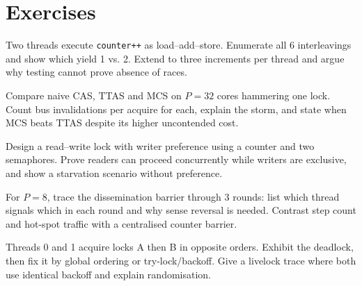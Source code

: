 \section{Exercises}
\begin{exercise}Two threads execute \texttt{counter++} as load--add--store. Enumerate all 6 interleavings and show which yield 1 vs. 2. Extend to three increments per thread and argue why testing cannot prove absence of races.\end{exercise}
\begin{exercise}Compare naive CAS, TTAS and MCS on $P=32$ cores hammering one lock. Count bus invalidations per acquire for each, explain the storm, and state when MCS beats TTAS despite its higher uncontended cost.\end{exercise}
\begin{exercise}Design a read--write lock with writer preference using a counter and two semaphores. Prove readers can proceed concurrently while writers are exclusive, and show a starvation scenario without preference.\end{exercise}
\begin{exercise}For $P=8$, trace the dissemination barrier through 3 rounds: list which thread signals which in each round and why sense reversal is needed. Contrast step count and hot-spot traffic with a centralised counter barrier.\end{exercise}
\begin{exercise}Threads 0 and 1 acquire locks A then B in opposite orders. Exhibit the deadlock, then fix it by global ordering or try-lock/backoff. Give a livelock trace where both use identical backoff and explain randomisation.\end{exercise}